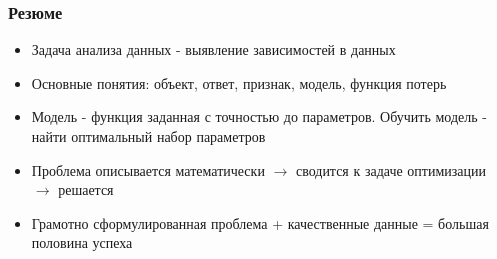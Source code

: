 \documentclass{beamer}
\begin{document}
	\begin{frame}
		\frametitle{Резюме}
		\begin{itemize}
			\item Задача анализа данных - выявление зависимостей в данных
			
			\item Основные понятия: объект, ответ, признак, модель, функция потерь
			
			\item Модель - функция заданная с точностью до параметров. Обучить модель - найти оптимальный набор параметров
			
			\item Проблема описывается математически $\to$ сводится к задаче оптимизации $\to$ решается
		
			\item Грамотно сформулированная проблема + качественные данные = большая половина успеха
		\end{itemize}

		
	\end{frame}
		
\end{document}
